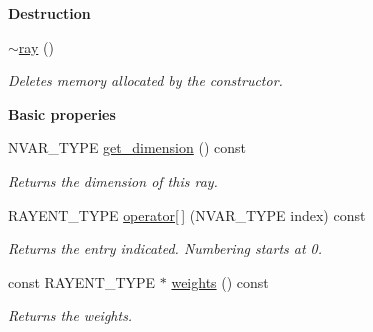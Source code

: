 \begin{Indent}\textbf{ Destruction}\par
\begin{DoxyCompactItemize}
\item 
\hyperlink{group___c_l_s_solvers_ae29c6b5cecdc32127dc9e5c0141d120d}{$\sim$ray} ()
\begin{DoxyCompactList}\small\item\em Deletes memory allocated by the constructor. \end{DoxyCompactList}\end{DoxyCompactItemize}
\end{Indent}
\begin{Indent}\textbf{ Basic properies}\par
\begin{DoxyCompactItemize}
\item 
\mbox{\label{group___c_l_s_solvers_a57662d3f86d00384f73869740ec21adf}} 
N\+V\+A\+R\+\_\+\+T\+Y\+PE \hyperlink{group___c_l_s_solvers_a57662d3f86d00384f73869740ec21adf}{get\+\_\+dimension} () const
\begin{DoxyCompactList}\small\item\em Returns the dimension of this ray. \end{DoxyCompactList}\item 
\mbox{\label{group___c_l_s_solvers_a952d271bf4f9361c87864e7479fb8677}} 
R\+A\+Y\+E\+N\+T\+\_\+\+T\+Y\+PE \hyperlink{group___c_l_s_solvers_a952d271bf4f9361c87864e7479fb8677}{operator\mbox{[}$\,$\mbox{]}} (N\+V\+A\+R\+\_\+\+T\+Y\+PE index) const
\begin{DoxyCompactList}\small\item\em Returns the entry indicated. Numbering starts at 0. \end{DoxyCompactList}\item 
\mbox{\label{group___c_l_s_solvers_aaff8d27de2240e43dc0d20f84f953b1b}} 
const R\+A\+Y\+E\+N\+T\+\_\+\+T\+Y\+PE $\ast$ \hyperlink{group___c_l_s_solvers_aaff8d27de2240e43dc0d20f84f953b1b}{weights} () const
\begin{DoxyCompactList}\small\item\em Returns the weights. \end{DoxyCompactList}\item 
\mbox{\label{group___c_l_s_solvers_a785bb4f7649e9c3db1141fdde55834c0}} 

\end{DoxyCompactItemize}
\end{Indent}
